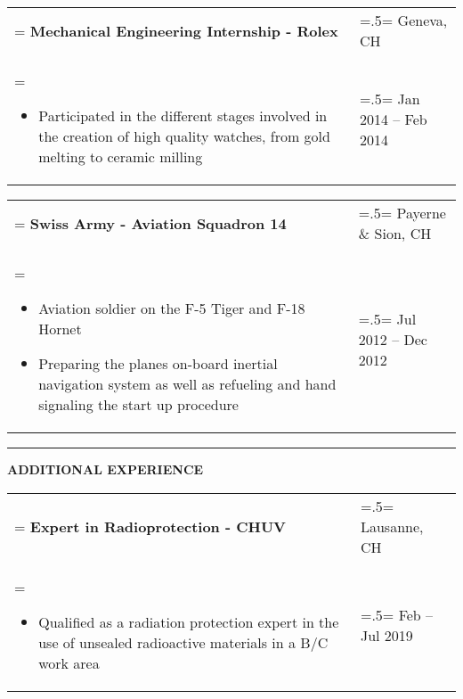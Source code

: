\documentclass[letterpaper, 11pt]{article}
\begin{document}
\begin{tabularx}{1.0\textwidth} { 
   >{\raggedright\arraybackslash\hsize=1.5\hsize\linewidth=\hsize}X 
   >{\raggedleft\arraybackslash\hsize=.5\hsize\linewidth=\hsize}X }
\normalsize
\bf{Mechanical Engineering Internship - Rolex} & Geneva, CH\\
\normalfont \begin{itemize}[leftmargin=*,noitemsep,topsep=0pt]
\item Participated in the different stages involved in the creation of high quality watches, from gold melting to ceramic milling
\end{itemize} & Jan 2014 --  Feb 2014
\end{tabularx}

\begin{tabularx}{1.0\textwidth} { 
   >{\raggedright\arraybackslash\hsize=1.5\hsize\linewidth=\hsize}X 
   >{\raggedleft\arraybackslash\hsize=.5\hsize\linewidth=\hsize}X }
\normalsize
\bf{Swiss Army - Aviation Squadron 14} & Payerne \& Sion, CH\\
\normalfont \begin{itemize}[leftmargin=*,noitemsep,topsep=0pt]
\item Aviation soldier on the F-5 Tiger and F-18 Hornet
\item Preparing the planes on-board inertial navigation system as well as refueling and hand signaling the start up procedure
\end{itemize} & Jul 2012 -- Dec 2012
\end{tabularx}

\begin{center}
\noindent\rule{0.75\textwidth}{1pt}
\end{center}

\begin{center}
\large\bf{ADDITIONAL EXPERIENCE}
\end{center}

\begin{tabularx}{1.0\textwidth} { 
   >{\raggedright\arraybackslash\hsize=1.5\hsize\linewidth=\hsize}X 
   >{\raggedleft\arraybackslash\hsize=.5\hsize\linewidth=\hsize}X }
\normalsize
\bf{Expert in Radioprotection - CHUV} & Lausanne, CH\\
\normalfont \begin{itemize}[leftmargin=*,noitemsep,topsep=0pt]
\item Qualified as a radiation protection expert in the use of unsealed radioactive materials in a B/C work area
\end{itemize} & Feb -- Jul 2019
\end{tabularx}
\end{document}
